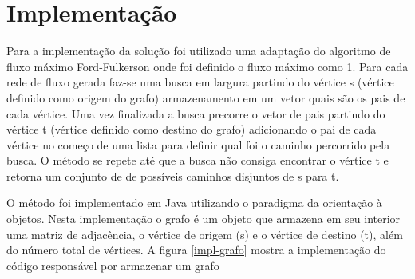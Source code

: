 
\section{\esp Implementação}

Para a implementação da solução foi utilizado uma adaptação do algoritmo de fluxo máximo Ford-Fulkerson \cite{site} onde foi definido o fluxo máximo como 1. Para cada rede de fluxo gerada faz-se uma busca em largura partindo do vértice s (vértice definido como origem do grafo) armazenamento em um vetor quais são os pais de cada vértice. Uma vez finalizada a busca precorre o vetor de pais partindo do vértice t (vértice definido como destino do grafo) adicionando o pai de cada vértice no começo de uma lista para definir qual foi o caminho percorrido pela busca. O método se repete até que a busca não consiga encontrar o vértice t e retorna um conjunto de de possíveis caminhos disjuntos de s para t.

O método foi implementado em Java utilizando o paradigma da orientação à objetos. Nesta implementação o grafo é um objeto que armazena em seu interior uma matriz de adjacência, o vértice de origem (s) e o vértice de destino (t), além do número total de vértices. A figura \ref{impl-grafo} mostra a implementação do código responsável por armazenar um grafo

